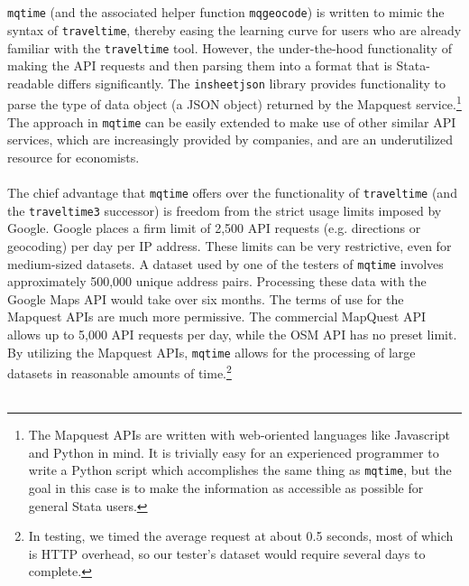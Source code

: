 \documentclass[11pt]{article}
\begin{document}
\\ \\
\texttt{mqtime} (and the associated helper function \verb|mqgeocode|) is written to mimic the syntax of \verb|traveltime|, thereby easing the learning curve for users who are already familiar with the \verb|traveltime| tool. However, the under-the-hood functionality of making the API requests and then parsing them into a format that is Stata-readable differs significantly. The \verb|insheetjson| library provides functionality to parse the type of data object (a JSON object) returned by the Mapquest service.\footnote{The Mapquest APIs are written with web-oriented languages like Javascript and Python in mind. It is trivially easy for an experienced programmer to write a Python script which accomplishes the same thing as \texttt{mqtime}, but the goal in this case is to make the information as accessible as possible for general Stata users.} The approach in \verb|mqtime| can be easily extended to make use of other similar API services, which are increasingly provided by companies, and are an underutilized resource for economists. 
\\ \\
The chief advantage that \verb|mqtime| offers over the functionality of \verb|traveltime| (and the \verb|traveltime3| successor) is freedom from the strict usage limits imposed by Google. Google places a firm limit of 2,500 API requests (e.g. directions or geocoding) per day per IP address. These limits can be very restrictive, even for medium-sized datasets. A dataset used by one of the testers of \verb|mqtime| involves approximately 500,000 unique address pairs. Processing these data with the Google Maps API would take over six months. The terms of use for the Mapquest APIs are much more permissive. The commercial MapQuest API allows up to 5,000 API requests per day, while the OSM API has no preset limit. By utilizing the Mapquest APIs, \verb|mqtime| allows for the processing of large datasets in reasonable amounts of time.\footnote{In testing, we timed the average request at about 0.5 seconds, most of which is HTTP overhead, so our tester's dataset would require several days to complete.} 
\\ \\
\end{document}
